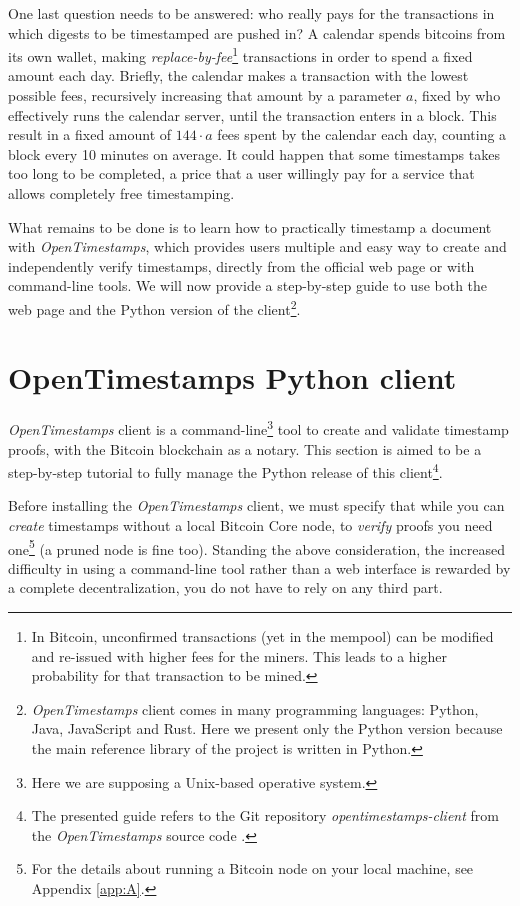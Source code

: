 \newpage
\noindent
One last question needs to be answered: who really pays for the transactions in which digests to be timestamped are pushed in? A calendar spends bitcoins from its own wallet, making \textit{replace-by-fee}\textup{\footnote{In Bitcoin, unconfirmed transactions (yet in the mempool) can be modified and re-issued with higher fees for the miners. This leads to a higher probability for that transaction to be mined.}} transactions in order to spend a fixed amount each day. Briefly, the calendar makes a transaction with the lowest possible fees, recursively increasing that amount by a parameter $a$, fixed by who effectively runs the calendar server, until the transaction enters in a block. This result in a fixed amount of $144 \cdot a$ fees spent by the calendar each day, counting a block every 10 minutes on average. It could happen that some timestamps takes too long to be completed, a price that a user willingly pay for a service that allows completely free timestamping.

\bigskip
\noindent
What remains to be done is to learn how to practically timestamp a document with \textit{OpenTimestamps}, which provides users multiple and easy way to create and independently verify timestamps, directly from the official web page \cite{OTSWeb} or with command-line tools. We will now provide a step-by-step guide to use both the web page and the Python version of the client\footnote{\textit{OpenTimestamps} client comes in many programming languages: Python, Java, JavaScript and Rust. Here we present only the Python version because the main reference library of the project is written in Python.}.

\bigskip
\section{OpenTimestamps Python client}
\textit{OpenTimestamps} client is a command-line\footnote{Here we are supposing a Unix-based operative system.} tool to create and validate timestamp proofs, with the Bitcoin blockchain as a notary. This section is aimed to be a step-by-step tutorial to fully manage the Python release of this client\footnote{The presented guide refers to the Git repository \textit{opentimestamps-client} from the \textit{OpenTimestamps} source code \cite{OpenTimestampsGithub}.}.

\bigskip
\noindent
Before installing the \textit{OpenTimestamps} client, we must specify that while you can \textit{create} timestamps without a local Bitcoin Core node, to \textit{verify} proofs you need one\footnote{For the details about running a Bitcoin node on your local machine, see Appendix \ref{app:A}.} (a pruned node is fine too). Standing the above consideration, the increased difficulty in using a command-line tool rather than a web interface is rewarded by a complete decentralization, you do not have to rely on any third part.

